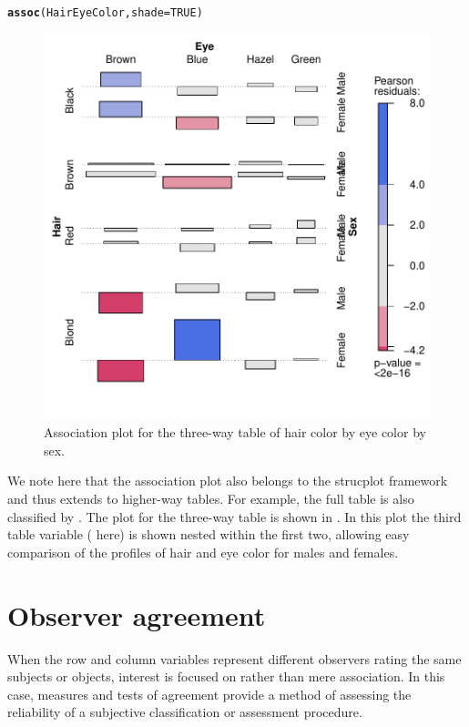 \documentclass[11pt]{book}\usepackage[]{graphicx}\usepackage[]{color}
\makeatletter
\newcommand{\hlnum}[1]{\textcolor[rgb]{0.686,0.059,0.569}{#1}}%
\newcommand{\hlstd}[1]{\textcolor[rgb]{0.345,0.345,0.345}{#1}}%
\newcommand{\hlkwc}[1]{\textcolor[rgb]{0.333,0.667,0.333}{#1}}%
\newcommand{\hlkwd}[1]{\textcolor[rgb]{0.737,0.353,0.396}{\textbf{#1}}}%
\newenvironment{kframe}{%
 \def\at@end@of@kframe{}%
 \ifinner\ifhmode%
  \def\at@end@of@kframe{\end{minipage}}%
  \begin{minipage}{\columnwidth}%
 \fi\fi%
 \def\FrameCommand##1{\hskip\@totalleftmargin \hskip-\fboxsep
 \colorbox{shadecolor}{##1}\hskip-\fboxsep
     \hskip-\linewidth \hskip-\@totalleftmargin \hskip\columnwidth}%
 \MakeFramed {\advance\hsize-\width
   \@totalleftmargin\z@ \linewidth\hsize
   \@setminipage}}%
 {\par\unskip\endMakeFramed%
 \at@end@of@kframe}
\newenvironment{knitrout}{}{} %
\renewenvironment{knitrout}{\small\renewcommand{\baselinestretch}{.85}}{} %
\makeatother
\begin{document}
\begin{knitrout}
\color{fgcolor}\begin{kframe}
\begin{alltt}
\hlkwd{assoc}\hlstd{(HairEyeColor,} \hlkwc{shade}\hlstd{=}\hlnum{TRUE}\hlstd{)}
\end{alltt}
\end{kframe}\begin{figure}[htbp]


\centerline{\includegraphics[width=.6\textwidth]{ch04/fig/HE-assoc2} }

\caption[Association plot for the three-way table of hair color by eye color by sex]{Association plot for the three-way table of hair color by eye color by sex.\label{fig:HE-assoc2}}
\end{figure}


\end{knitrout}

We note here that the association plot also belongs to the
strucplot framework and thus extends to higher-way tables.
For example, the full  table is
also classified by .  
The plot for the three-way table
is shown in . 
In this plot the third table
variable ( here) is shown nested within the first two,
allowing easy comparison of the profiles of hair and eye color
for males and females.


\section{Observer agreement}\label{sec:twoway-agree}

When the row and column variables represent different
observers rating the same subjects or objects, interest is focused on
 rather than mere association.
In this case, measures and tests
of agreement provide a method of assessing the
reliability of a subjective classification or assessment procedure.
\end{document}
